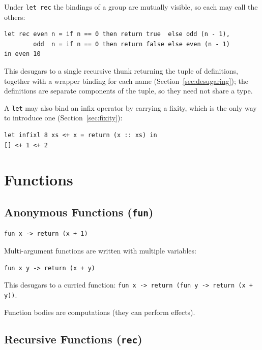 \documentclass[11pt,a4paper]{article}
\newcommand{\cba}[1]{\lstinline[style=cbainline]{#1}}
\begin{document}
Under \cba{let rec} the bindings of a group are mutually visible, so each
may call the others:

\begin{lstlisting}
let rec even n = if n == 0 then return true  else odd (n - 1),
        odd  n = if n == 0 then return false else even (n - 1)
in even 10
\end{lstlisting}

This desugars to a single recursive thunk returning the tuple of definitions,
together with a wrapper binding for each name (Section~\ref{sec:desugaring});
the definitions are separate components of the tuple, so they need not share
a type.

A \cba{let} may also bind an infix operator by carrying a fixity, which is
the only way to introduce one (Section~\ref{sec:fixity}):

\begin{lstlisting}
let infixl 8 xs <+ x = return (x :: xs) in
[] <+ 1 <+ 2
\end{lstlisting}

\section{Functions}
\label{sec:functions}

\subsection{Anonymous Functions (\texttt{fun})}

\begin{lstlisting}
fun x -> return (x + 1)
\end{lstlisting}

Multi-argument functions are written with multiple variables:

\begin{lstlisting}
fun x y -> return (x + y)
\end{lstlisting}

This desugars to a curried function:
\cba{fun x -> return (fun y -> return (x + y))}.

Function bodies are computations (they can perform effects).

\subsection{Recursive Functions (\texttt{rec})}
\end{document}
